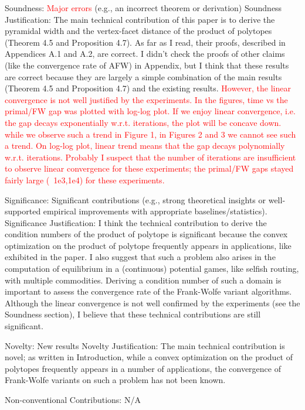 \documentclass[a4wide]{article}
\begin{document}
Soundness: \textcolor{red}{Major errors} (e.g., an incorrect theorem or derivation)
Soundness Justification:
The main technical contribution of this paper is to derive the pyramidal width and the vertex-facet distance of the product of polytopes (Theorem 4.5 and Proposition 4.7). As far as I read, their proofs, described in Appendices A.1 and A.2, are correct. I didn't check the proofs of other claims (like the convergence rate of AFW) in Appendix, but I think that these results are correct because they are largely a simple combination of the main results (Theorem 4.5 and Proposition 4.7) and the existing results.
\textcolor{red}{However, the linear convergence is not well justified by the experiments. In the figures, time vs the primal/FW gap was plotted with log-log plot. If we enjoy linear convergence, i.e. the gap decays exponentially w.r.t. iterations, the plot will be concave down. while we observe such a trend in Figure 1, in Figures 2 and 3 we cannot see such a trend. On log-log plot, linear trend means that the gap decays polynomially w.r.t. iterations. Probably I suspect that the number of iterations are insufficient to observe linear convergence for these experiments; the primal/FW gaps stayed fairly large (~1e3,1e4) for these experiments.}

Significance: Significant contributions (e.g., strong theoretical insights or well-supported empirical improvements with appropriate baselines/statistics).
Significance Justification:
I think the technical contribution to derive the condition numbers of the product of polytope is significant because the convex optimization on the product of polytope frequently appears in applications, like exhibited in the paper. I also suggest that such a problem also arises in the computation of equilibrium in a (continuous) potential games, like selfish routing, with multiple commodities. Deriving a condition number of such a domain is important to assess the convergence rate of the Frank-Wolfe variant algorithms.
Although the linear convergence is not well confirmed by the experiments (see the Soundness section), I believe that these technical contributions are still significant.

Novelty: New results
Novelty Justification:
The main technical contribution is novel; as written in Introduction, while a convex optimization on the product of polytopes frequently appears in a number of applications, the convergence of Frank-Wolfe variants on such a problem has not been known.

Non-conventional Contributions:
N/A
\end{document}
